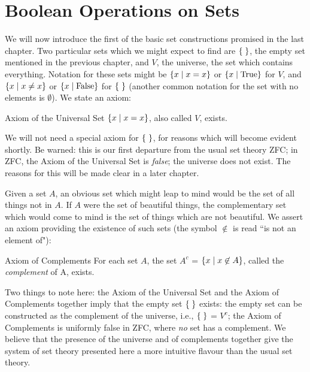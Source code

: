 \chapter[Boolean Operations on Sets]{Boolean
Operations on Sets}

We will now introduce the first of the basic set constructions
promised in the last chapter.  Two particular sets which we might expect to
find are $\mbox{$\{\;\}$}$, the empty set mentioned in the previous
chapter, and $V$,
the universe, the set which contains
everything.  Notation for these sets might be $\{x \mid x = x\}$ or
$\{x \mid \mathrm{True}\}$ for $V$, and $\{x \mid x \neq x\}$ or $\{x \mid
\mathrm{False}\}$ for $\mbox{$\{\;\}$}$ (another common notation for the set with no elements is $\emptyset$).  We state an axiom:

\begin{axiom}{Axiom of the Universal Set}
$\{x \mid x = x\}$, also called $V$, exists.
\end{axiom}

We will not need a special axiom for $\mbox{$\{\;\}$}$, for reasons which
will become evident shortly.  Be warned: this is our first departure
from the usual set theory ZFC; in ZFC, the
Axiom of the Universal Set is {\itshape false\/}; the universe does not exist.
The reasons for this will be made clear in a later chapter.

Given a set $A$, an obvious set which might leap to mind would
be the set of all things not in $A$.  If $A$ were the set of beautiful
things, the complementary set which would come to mind is the
set of things which are not beautiful.  We assert an axiom providing the
existence of such sets (the symbol $\not\in$ is read ``is not an element of"):

\begin{axiom}{Axiom of Complements}
  For each set $A$, the set $A^c$ = $\{x \mid x \not\in A\}$, called the
  {\itshape complement\/} of A, exists.  
\end{axiom}

Two things to note here:  the Axiom of the Universal Set and
the Axiom of Complements together imply that the empty set
$\mbox{$\{\;\}$}$ exists:
the empty set can be constructed as the complement of the universe,
i.e., $\mbox{$\{\;\}$}$ = $V^c$; the Axiom of Complements is uniformly false in
ZFC,
where {\itshape no\/} set has a complement.  We believe that the presence of
the universe and of complements together give the system of set
theory presented here a more intuitive flavour than the usual set
theory.

